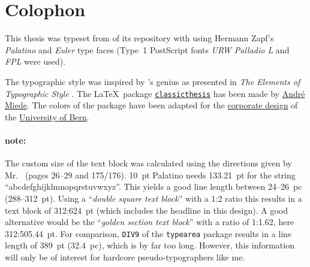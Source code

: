 \pagestyle{empty}
\hfill
\vfill
\section*{Colophon}
This thesis was typeset from \myVersion of its repository with \href{http://www.latex-project.org/}{\LaTeXe} using Hermann Zapf's \emph{Palatino} and \emph{Euler} type faces (Type~1 PostScript fonts \emph{URW Palladio L} and \emph{FPL} were used).

The typographic style was inspired by 's genius as presented in \emph{The Elements of Typographic Style} \citep{bringhurst:2002}. The \LaTeX\ package \href{http://www.ctan.org/tex-archive/macros/latex/contrib/classicthesis/}{\texttt{classicthesis}} has been made by \href{http://www.miede.de}{André Miede}. The colors of the package have been adapted for the \href{http://www.kommunikation.unibe.ch/intern/content/beratung/corporate_design/logo_schriften__farben/}{corporate design} of the \href{http://www.unibe.ch/}{University of Bern}.

\paragraph{note:} The custom size of the text block was calculated using the directions given by Mr.\ \citeauthor{bringhurst:2002} (pages 26--29 and 175/176). \SI{10}{pt} Palatino needs \SI{133.21}{pt} for the string ``abcdefghijklmnopqrstuvwxyz''. This yields a good line length between 24--\SI{26}{pc} (288--\SI{312}{pt}). Using a ``\emph{double square text block}'' with a 1:2 ratio this results in a text block of 312:\SI{624}{pt} (which includes the headline in this design). A good alternative would be the ``\emph{golden section text block}'' with a ratio of 1:1.62, here 312:\SI{505.44}{pt}. For comparison, \texttt{DIV9} of the \texttt{typearea} package results in a line length of \SI{389}{pt} (\SI{32.4}{pc}), which is by far too long. However, this information will only be of interest for hardcore pseudo-typographers like me.

%

\bigskip

\noindent \finalVersionString